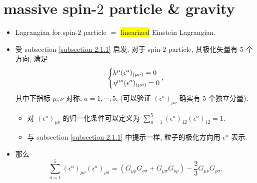 \section{massive spin-\texorpdfstring{$2$}{2} particle \& gravity}
\begin{itemize}
	\item Lagrangian for spin-$2$ particle $=$ \colorbox{yellow}{linearized} Einstein Lagrangian.
	
	\item 受 subsection \ref{subsection 2.1.1} 启发, 对于 spin-$2$ particle, 其极化矢量有 5 个方向, 满足
	\begin{equation} \label{2.2.1}
		\begin{dcases}
			k^\mu (\epsilon^a)_{(\mu \nu)} = 0 \\
			\eta^{\mu \nu} (\epsilon^a)_{(\mu \nu)} = 0
		\end{dcases},
	\end{equation}
	其中下指标 $\mu, \nu$ 对称, $a = 1, \cdots, 5$, (可以验证 $(\epsilon^a)_{\mu \nu}$ 确实有 5 个独立分量).
	\begin{itemize}
		\item 对 $(\epsilon^{a})_{\mu \nu}$ 的归一化条件可以定义为 $\sum_{a = 1}^5 (\epsilon^a)_{1 2} (\epsilon^a)_{1 2} = 1$.
		
		\item 与 subsection \ref{subsection 2.1.1} 中提示一样, 粒子的极化方向用 $e^a$ 表示.
	\end{itemize}
	
	\item 那么
	\begin{equation}
		\sum_{a = 1}^5 (\epsilon^a)_{\mu \nu} (\epsilon^a)_{\rho \sigma} = (G_{\mu \rho} G_{\nu \sigma} + G_{\mu \sigma} G_{\nu \rho}) - \frac{2}{3} G_{\mu \nu} G_{\rho \sigma}.
	\end{equation}
	

\end{itemize}
